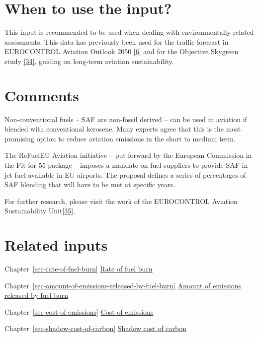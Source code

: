\documentclass[
  11pt,
  a4paper,
]{book}
\begin{document}
\hypertarget{when-to-use-the-input-5}{%
\section{When to use the input?}\label{when-to-use-the-input-5}}

This input is recommended to be used when dealing with environmentally
related assessments. This data has previously been used for the traffic
forecast in EUROCONTROL Aviation Outlook 2050
\protect\hyperlink{ref-aviation:outlook2022}{{[}6{]}} and for the
Objective Skygreen study \protect\hyperlink{ref-skygreen2022}{{[}34{]}},
guiding on long-term aviation sustainability.

\hypertarget{comments-4}{%
\section{Comments}\label{comments-4}}

Non-conventional fuels -- SAF are non-fossil derived -- can be used in
aviation if blended with conventional kerosene. Many experts agree that
this is the most promising option to reduce aviation emissions in the
short to medium term.

The ReFuelEU Aviation initiative -- put forward by the European
Commission in the Fit for 55 package -- imposes a mandate on fuel
suppliers to provide SAF in jet fuel available in EU airports. The
proposal defines a series of percentages of SAF blending that will have
to be met at specific years.

For further research, please visit the work of the EUROCONTROL Aviation
Sustainability Unit\protect\hyperlink{ref-ectl:asu}{{[}35{]}}.

\hypertarget{related-inputs-9}{%
\section{Related inputs}\label{related-inputs-9}}

Chapter~\ref{sec-rate-of-fuel-burn}
\protect\hyperlink{sec-rate-of-fuel-burn}{Rate of fuel burn}

Chapter~\ref{sec-amount-of-emissions-released-by-fuel-burn}
\protect\hyperlink{sec-amount-of-emissions-released-by-fuel-burn}{Amount
of emissions released by fuel burn}

Chapter~\ref{sec-cost-of-emissions}
\protect\hyperlink{sec-cost-of-emissions}{Cost of emissions}

Chapter~\ref{sec-shadow-cost-of-carbon}
\protect\hyperlink{sec-shadow-cost-of-carbon}{Shadow cost of carbon}
\end{document}
